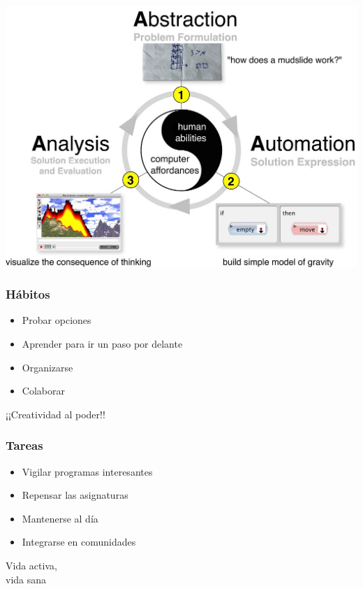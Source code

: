 \documentclass[17pt,aspectratio=169]{beamer}
\begin{document}

\begin{frame}

\includegraphics[height=\textheight]{figs/computational-thinking}
\end{frame}



\begin{frame}
\frametitle{Hábitos}

\begin{itemize}
\item Probar opciones
\item Aprender para ir un paso por delante
\item Organizarse
\item Colaborar
\end{itemize}

\begin{flushright}
  ¡¡Creatividad al poder!!
\end{flushright}
\end{frame}


\begin{frame}
\frametitle{Tareas}

\begin{itemize}
\item Vigilar programas interesantes
\item Repensar las asignaturas
\item Mantenerse al día
\item Integrarse en comunidades
\end{itemize}

\begin{flushright}
  Vida activa, \\
  vida sana \\
\end{flushright}
\end{frame}
\end{document}

